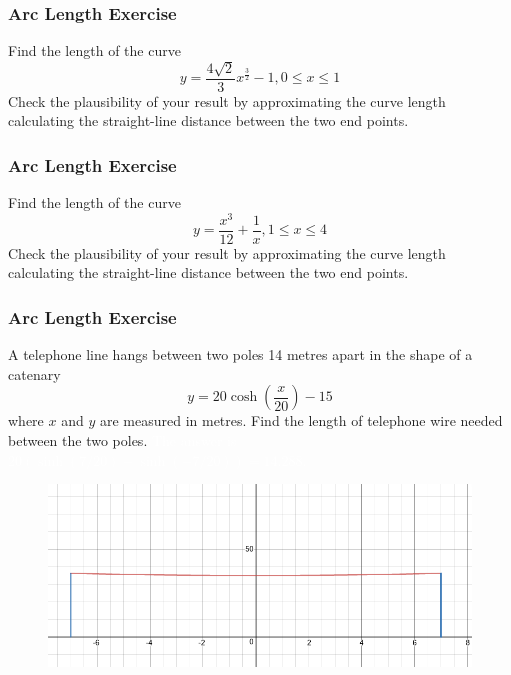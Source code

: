 \documentclass[xcolor=dvipsnames]{beamer}
\begin{document}
\begin{frame}
  \frametitle{Arc Length Exercise}
{\ubung} Find the length of the curve
  \begin{equation}
    \label{eq:ahwushei}
    y=\frac{4\sqrt{2}}{3}x^{\frac{3}{2}}-1,0\leq{}x\leq{}1
  \end{equation}
Check the plausibility of your result by approximating the curve
length calculating the straight-line distance between the two end
points.
\end{frame}

\begin{frame}
  \frametitle{Arc Length Exercise}
{\ubung} Find the length of the curve
  \begin{equation}
    \label{eq:aecejaej}
    y=\frac{x^{3}}{12}+\frac{1}{x},1\leq{}x\leq{}4
  \end{equation}
Check the plausibility of your result by approximating the curve
length calculating the straight-line distance between the two end
points.
\end{frame}

\begin{frame}
  \frametitle{Arc Length Exercise}
{\ubung} A telephone line hangs between two poles 14 metres apart in
the shape of a catenary
\begin{equation}
  \label{eq:lufaebeg}
  y=20\cosh\left(\frac{x}{20}\right)-15
\end{equation}
where $x$ and $y$ are measured in metres. Find the length of telephone
wire needed between the two poles. \textcolor{white}{The answer is $20(\sinh(7/20)-\sinh(-7/20))=14.288$.}
\begin{figure}[h]
  \includegraphics[scale=0.22]{./diagrams/telwire.png}
\end{figure}
\end{frame}

\addtocounter{equation}{-1}
\addtocounter{exercise}{-1}
\end{document}
